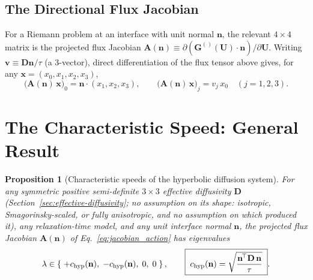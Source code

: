\documentclass[11pt, a4paper, parskip]{scrartcl}
\newcommand{\code}[1]{\texttt{\seqsplit{#1}}}
\theoremstyle{plain}
\newtheorem{proposition}{Proposition}
\theoremstyle{definition}
\theoremstyle{remark}
\newcommand{\nunit}{\mathbf{n}}                           %
\newcommand{\Uvec}{\mathbf{U}}                            %
\newcommand{\Gflux}[1]{\mathbf{G}^{(#1)}}                 %
\newcommand{\chyp}{c_{\rm hyp}}                           %
\newcommand{\taurelax}{\tau}                              %
\newcommand{\Deff}{\mathbf{D}}                            %
\begin{document}
\subsection{The Directional Flux Jacobian}
For a Riemann problem at an interface with unit normal $\nunit$, the
relevant $4\times4$ matrix is the projected flux Jacobian
$\mathbf A(\nunit) \equiv \partial(\Gflux{}(\Uvec)\cdot\nunit)/\partial\Uvec$.
Writing $\mathbf v \equiv \Deff\nunit/\taurelax$ (a 3-vector), direct
differentiation of the flux tensor above gives, for any $\mathbf x =
(x_0,x_1,x_2,x_3)$,
\begin{equation}
  \label{eq:jacobian_action}
  \big(\mathbf A(\nunit)\,\mathbf x\big)_0 = \nunit\cdot(x_1,x_2,x_3) ,
  \qquad
  \big(\mathbf A(\nunit)\,\mathbf x\big)_j = v_j\, x_0 \quad (j=1,2,3) .
\end{equation}

\section{The Characteristic Speed: General Result}
\label{sec:main-theorem}

\begin{proposition}[Characteristic speeds of the hyperbolic diffusion system]
\label{prop:main}
For any symmetric positive semi-definite $3\times3$ effective diffusivity
$\Deff$ (Section~\ref{sec:effective-diffusivity}; no assumption on its
shape: isotropic, Smagorinsky-scaled, or fully anisotropic, and no
assumption on which \code{diffusion\_mode} produced it), any
relaxation-time model, and any unit interface normal $\nunit$, the
projected flux Jacobian $\mathbf A(\nunit)$ of Eq.~\eqref{eq:jacobian_action}
has eigenvalues
\begin{equation}
  \label{eq:main_result}
  \lambda \in \left\{ \; +\chyp(\nunit),\; -\chyp(\nunit),\; 0,\; 0 \; \right\} ,
  \qquad
  \boxed{\;\chyp(\nunit) = \sqrt{\dfrac{\nunit^{\!\top}\Deff\,\nunit}{\taurelax}}\;} .
\end{equation}
\end{proposition}
\end{document}

